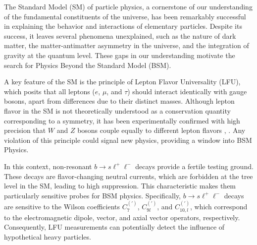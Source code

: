 The Standard Model (SM) of particle physics, a cornerstone of our 
understanding of the fundamental constituents of the universe, 
has been remarkably successful in explaining the behavior 
and interactions of elementary particles. Despite its success, 
it leaves several phenomena unexplained, such as the 
nature of dark matter, the matter-antimatter asymmetry in the 
universe, and the integration of gravity at the quantum level. 
These gaps in our understanding motivate the search for Physics 
Beyond the Standard Model (BSM).

A key feature of the SM is the principle of Lepton 
Flavor Universality (LFU), which posits that all leptons ($e$, 
$\mu$, and $\tau$) should interact identically with gauge bosons, 
apart from differences due to their distinct masses. Although 
lepton flavor in the SM is not theoretically understood 
as a conservation quantity corresponding to a symmetry, it has 
been experimentally confirmed with high precision that $W$ and $Z$ 
bosons couple equally to different lepton flavors \cite{LU_CDF}, 
\cite{LU_ATLAS}. Any violation of this principle could signal new 
physics, providing a window into BSM Physics.

In this context, non-resonant $b\to s\ell^+\ell^-$ decays provide a fertile 
testing ground. These decays are flavor-changing neutral currents, 
which are forbidden at the tree level in the SM, leading to high 
suppression. This characteristic makes them particularly sensitive 
probes for BSM physics. Specifically, $b\to s\ell^+\ell^-$ decays are 
sensitive to the Wilson coefficients $C_7^{\scriptscriptstyle (')}$, 
$C_{9l}^{\scriptscriptstyle (')}$, and $C_{10,l}^{\scriptscriptstyle (')}$, 
which correspond to the electromagnetic dipole, vector, and axial 
vector operators, respectively. %
Consequently, LFU measurements can potentially detect the influence 
of hypothetical heavy particles.

